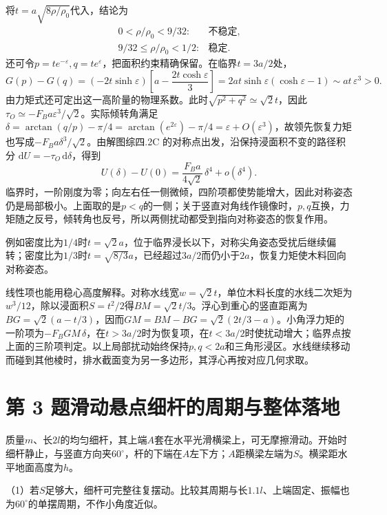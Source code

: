 \documentclass[UTF8,fontset=fandol,a4paper,11pt]{ctexart}
\begin{document}
将$t=a\sqrt{8\rho/\rho_0}$代入，结论为
\[
\boxed{\begin{array}{ll}
0<\rho/\rho_0<9/32:&\text{不稳定},\\
9/32\le\rho/\rho_0<1/2:&\text{稳定}.
\end{array}}
\]
还可令$p=t e^{-\varepsilon},q=t e^\varepsilon$，把面积约束精确保留。在临界$t=3a/2$处，
\[
G(p)-G(q)
=(-2t\sinh\varepsilon)
\left[a-\frac{2t\cosh\varepsilon}{3}\right]
=2at\sinh\varepsilon(\cosh\varepsilon-1)
\sim at\,\varepsilon^3>0.
\]
由力矩式还可定出这一高阶量的物理系数。此时$\sqrt{p^2+q^2}\simeq\sqrt2t$，因此$\tau_O\simeq-F_Ba\varepsilon^3/\sqrt2$。实际倾转角满足$\delta=\arctan(q/p)-\pi/4=\arctan(e^{2\varepsilon})-\pi/4=\varepsilon+O(\varepsilon^3)$，故领先恢复力矩也写成$-F_Ba\delta^3/\sqrt2$。由解图综四.2C 的对称点出发，沿保持浸面积不变的路径积分 $\mathrm dU=-\tau_O\,\mathrm d\delta$，得到
\[
U(\delta)-U(0)=\frac{F_Ba}{4\sqrt2}\,\delta^4+o(\delta^4).
\]
临界时，一阶刚度为零；向左右任一侧微倾，四阶项都使势能增大，因此对称姿态仍是局部极小。上面取的是$p<q$的一侧；关于竖直对角线作镜像时，$p,q$互换，力矩随之反号，倾转角也反号，所以两侧扰动都受到指向对称姿态的恢复作用。

例如密度比为$1/4$时$t=\sqrt2a$，位于临界浸长以下，对称尖角姿态受扰后继续偏转；密度比为$1/3$时$t=\sqrt{8/3}a$，已经超过$3a/2$而仍小于$2a$，恢复力矩使木料回向对称姿态。

线性项也能用稳心高度解释。对称水线宽$w=\sqrt2t$，单位木料长度的水线二次矩为$w^3/12$，除以浸面积$S=t^2/2$得$BM=\sqrt2t/3$。浮心到重心的竖直距离为$BG=\sqrt2(a-t/3)$，因而$GM=BM-BG=\sqrt2(2t/3-a)$。小角浮力矩的一阶项为$-F_BGM\,\delta$，在$t>3a/2$时为恢复项，在$t<3a/2$时使扰动增大；临界点按上面的三阶项判定。以上局部扰动始终保持$p,q<2a$和三角形浸区。水线继续移动而碰到其他棱时，排水截面变为另一多边形，其浮心再按对应几何求取。




\section*{第 3 题\quad 滑动悬点细杆的周期与整体落地}\label{q:3}


质量$m$、长$2l$的均匀细杆，其上端$A$套在水平光滑横梁上，可无摩擦滑动。开始时细杆静止，与竖直方向夹$60^\circ$，杆的下端在$A$左下方；$A$距横梁左端为$S$。横梁距水平地面高度为$h$。

（1）若$S$足够大，细杆可完整往复摆动。比较其周期与长$1.1l$、上端固定、振幅也为$60^\circ$的单摆周期，不作小角度近似。
\end{document}
